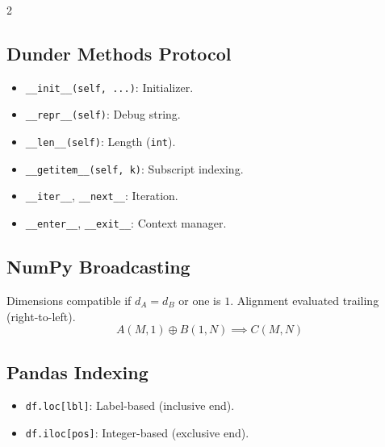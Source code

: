 \begin{multicols}{2}
\subsection*{Dunder Methods Protocol}
\begin{itemize}[leftmargin=1.2em, itemsep=1pt]
    \item \texttt{\_\_init\_\_(self, ...)}: Initializer.
    \item \texttt{\_\_repr\_\_(self)}: Debug string.
    \item \texttt{\_\_len\_\_(self)}: Length (\texttt{int}).
    \item \texttt{\_\_getitem\_\_(self, k)}: Subscript indexing.
    \item \texttt{\_\_iter\_\_}, \texttt{\_\_next\_\_}: Iteration.
    \item \texttt{\_\_enter\_\_}, \texttt{\_\_exit\_\_}: Context manager.
\end{itemize}

\subsection*{NumPy Broadcasting}
Dimensions compatible if $d_A = d_B$ or one is $1$. Alignment evaluated trailing (right-to-left).
\begin{equation}
A(M, 1) \oplus B(1, N) \implies C(M, N)
\end{equation}

\subsection*{Pandas Indexing}
\begin{itemize}[leftmargin=1.2em, itemsep=1pt]
    \item \texttt{df.loc[lbl]}: Label-based (inclusive end).
    \item \texttt{df.iloc[pos]}: Integer-based (exclusive end).
\end{itemize}
\end{multicols}
\newpage
